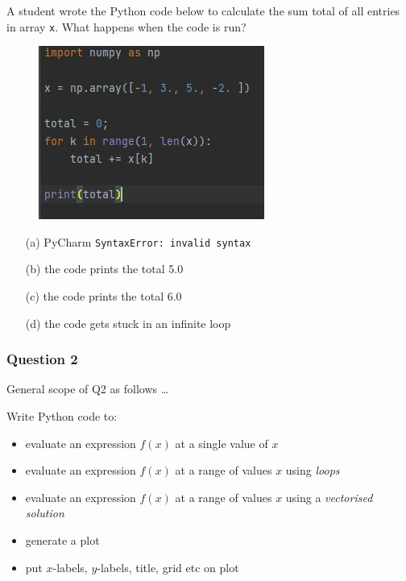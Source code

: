 \documentclass[english,14pt]{beamer}
\begin{document}

\begin{frame}[fragile]

\frametitle{}

{\small 
A student wrote the Python code below to calculate the sum total of all entries in array \texttt{x}. What happens when the code is run?}
\begin{figure}[ht]
	\centering
	\includegraphics[width=.5\textwidth]{figures/sampleq1}
\end{figure}

\begin{itemize}
	\item[(a)] PyCharm \texttt{SyntaxError:~invalid syntax}
	\item[(b)] the code prints the total 5.0
	\item[(c)] the code prints the total 6.0
	\item[(d)] the code gets stuck in an infinite loop
\end{itemize}

\end{frame}


\begin{frame}[fragile]

\frametitle{Question 2}

General scope of Q2 as follows \ldots

\vspace*{5mm}

Write Python code to:

\begin{itemize}
	\item evaluate an expression $f(x)$ at a single value of $x$
	\item evaluate an expression $f(x)$ at a range of values $x$ using \emph{loops}
	\item evaluate an expression $f(x)$ at a range of values $x$ using a \emph{vectorised solution}
	\item generate a plot
	\item put $x$-labels, $y$-labels, title, grid etc on plot
\end{itemize}

\end{frame}
\end{document}
